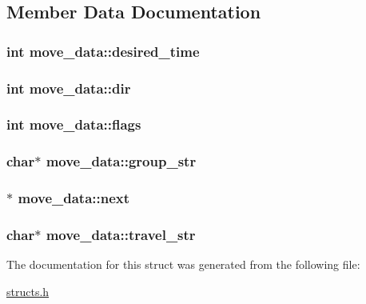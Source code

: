 \subsection{Member Data Documentation}
\hypertarget{structmove__data_a7c41b4b47c38ac031d71ce22514e813d}{
\subsubsection[{desired\-\_\-time}]{\setlength{\rightskip}{0pt plus 5cm}int move\-\_\-data\-::desired\-\_\-time}}\label{structmove__data_a7c41b4b47c38ac031d71ce22514e813d}
\hypertarget{structmove__data_a11e9cf46d09bdf985b70365e2937efc5}{
\subsubsection[{dir}]{\setlength{\rightskip}{0pt plus 5cm}int move\-\_\-data\-::dir}}\label{structmove__data_a11e9cf46d09bdf985b70365e2937efc5}
\hypertarget{structmove__data_aae78dcc287c2ddc1672b4dced5693930}{
\subsubsection[{flags}]{\setlength{\rightskip}{0pt plus 5cm}int move\-\_\-data\-::flags}}\label{structmove__data_aae78dcc287c2ddc1672b4dced5693930}
\hypertarget{structmove__data_ae11f708d9b104c9fd04020a47600206f}{
\subsubsection[{group\-\_\-str}]{\setlength{\rightskip}{0pt plus 5cm}char$\ast$ move\-\_\-data\-::group\-\_\-str}}\label{structmove__data_ae11f708d9b104c9fd04020a47600206f}
\hypertarget{structmove__data_a6ee2946da58be102d7cd1dd6a8b6b1bf}{
\subsubsection[{next}]{$\ast$ move\-\_\-data\-::next}}\label{structmove__data_a6ee2946da58be102d7cd1dd6a8b6b1bf}
\hypertarget{structmove__data_a9828ffea5b0502f341fe3bf1f3954108}{
\subsubsection[{travel\-\_\-str}]{\setlength{\rightskip}{0pt plus 5cm}char$\ast$ move\-\_\-data\-::travel\-\_\-str}}\label{structmove__data_a9828ffea5b0502f341fe3bf1f3954108}


The documentation for this struct was generated from the following file\-:\begin{DoxyCompactItemize}
\item 
\hyperlink{structs_8h}{structs.\-h}\end{DoxyCompactItemize}
